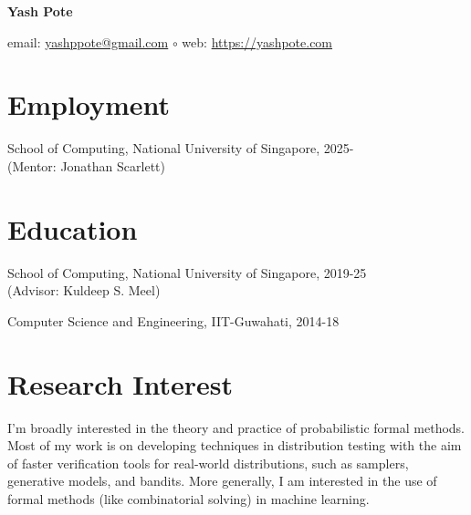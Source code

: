 \documentclass[12pt,letterpaper]{report}
\newcommand{\myname}{Yash Pote}
\newcommand{\namefont}[1]{{\normalfont\bfseries\Huge{#1}}}
\begin{document}
	\raggedright
	
	\namefont{\myname}
	
	\vspace{1em}
	\begin{minipage}[t]{0.68\textwidth}
		email: \href{mailto:yashppote@gmail.com}{yashppote@gmail.com} \quad $\circ$
		web: \href{https://yashpote.com}{https://yashpote.com}
	\end{minipage}
	\vspace{0.5em}
	
	\section*{Employment}
	
	\begin{tablist}
		\item[Postdoc] \tab School of Computing, National University of Singapore, 2025-    \\
		(Mentor:  Jonathan Scarlett)
		
	\end{tablist}
	
	\section*{Education}
	
	\begin{tablist}
		
		
		\item[Ph.D.] \tab School of Computing, National University of Singapore, 2019-25
		\\
		(Advisor:  Kuldeep S. Meel)
		
		\item[B.Tech.]  \tab Computer Science and Engineering, IIT-Guwahati, 2014-18
	\end{tablist}
	
	\section*{Research Interest}
	
	I'm broadly interested in the theory and practice of probabilistic formal methods. Most of my work is on  developing techniques in distribution testing with the aim of faster verification tools for real-world distributions, such as samplers, generative models, and bandits.  More generally, I am interested in the use of formal methods (like combinatorial solving) in machine learning.
	
\end{document}
